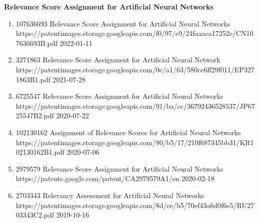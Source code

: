 \headedsection %
{\bf Relevance Score Assignment for Artificial Neural Networks}
{
    \ifdefined\shortcv
        {}
    \else
        {
            \begin{enumerate}
                \item[] 
                                {107636693}
                                {Relevance Score Assignment for Artificial Neural Networks}
                                {https://patentimages.storage.googleapis.com/f0/97/e9/24faaaca17252c/CN107636693B.pdf}
                                {2022-01-11}

                \item [] 
                                {3271863}
                                {Relevance Score Assignment for Artificial Neural Network}
                                {https://patentimages.storage.googleapis.com/0c/a1/63/580ce6ff29f011/EP3271863B1.pdf}
                                {2021-07-28}

                \item [] 
                                {6725547}
                                {Relevance Score Assignment for Artificial Neural Networks}
                                {https://patentimages.storage.googleapis.com/91/ba/cc/36792436528537/JP6725547B2.pdf}
                                {2020-07-22}

                \item [] 
                                {102130162}
                                {Assignment of Relevance Scores for Artificial Neural Networks}
                                {https://patentimages.storage.googleapis.com/80/b5/17/210f687345bb31/KR102130162B1.pdf}
                                {2020-07-06}

                \item [] 
                                {2979579}
                                {Relevance Score Assignment for Artificial Neural Networks}
                                {https://patents.google.com/patent/CA2979579A1/en}
                                {2020-02-18}

                \item [] 
                                {2703343}
                                {Relevancy Assessment for Artificial Neural Networks}
                                {https://patentimages.storage.googleapis.com/8d/ce/b5/70ef43a6d0f6e5/RU2703343C2.pdf}
                                {2019-10-16}


\end{enumerate}}}
